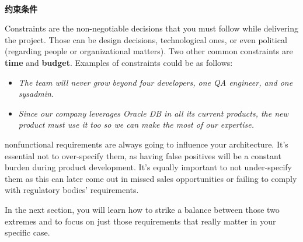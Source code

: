 \hspace*{\fill} \\ %
\noindent
\textbf{约束条件}

Constraints are the non-negotiable decisions that you must follow while delivering the project. Those can be design decisions, technological ones, or even political (regarding people or organizational matters). Two other common constraints are \textbf{time} and \textbf{budget}. Examples of constraints could be as follows:

\begin{itemize}
\item 
\textit{The team will never grow beyond four developers, one QA engineer, and one sysadmin.}

\item 
\textit{Since our company leverages Oracle DB in all its current products, the new product must use it too so we can make the most of our expertise.
}
\end{itemize}

nonfunctional requirements are always going to influence your architecture. It's essential not to over-specify them, as having false positives will be a constant burden during product development. It's equally important to not under-specify them as this can later come out in missed sales opportunities or failing to comply with regulatory bodies' requirements.

In the next section, you will learn how to strike a balance between those two extremes and to focus on just those requirements that really matter in your specific case.





